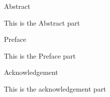 
\begin{center}
  \Large{Abstract}
  \end{center}
  
  \vspace*{\baselineskip}
  
  This is the Abstract part
  
  \newpage
  
  
  \begin{center}
  \Large{Preface}
  \end{center}
  
  \vspace*{\baselineskip}
  
  This is the Preface part
  
  \newpage
  
  
  \begin{center}
  \Large{Acknowledgement}
  \end{center}
  
  \vspace*{\baselineskip}
  
  This is the acknowledgement part
  
  \newpage
  
